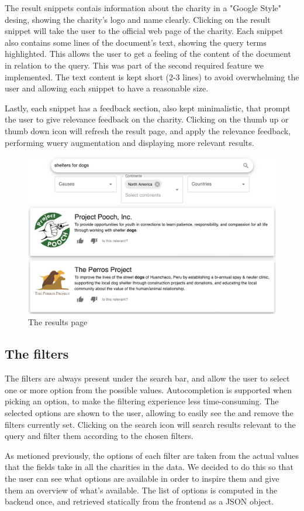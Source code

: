 \documentclass[unicode,9pt,a4paper,oneside,numbers=endperiod,openany]{scrartcl}
\begin{document}
The result snippets contais information about the charity in a "Google Style" desing, showing the charity's logo and name clearly.
Clicking on the result snippet will take the user to the official web page of the charity. 
Each snippet also contains some lines of the document's text, showing the query terms highlighted. This allows the user to 
get a feeling of the content of the document in relation to the query. This was part of the second required feature we implemented.
The text content is kept short (2-3 lines) to avoid overwhelming the user and allowing each snippet to have a reasonable size.

Lastly, each snippet has a feedback section, also kept minimalistic, that prompt the user to give relevance feedback on the charity.
Clicking on the thumb up or thumb down icon will refresh the result page, and apply the relevance feedback, performing wuery augmentation and displaying more relevant results.

\begin{figure}[h]
    \centering
    \includegraphics[width=0.6\linewidth]{fig/results-page.png}
    \caption{The results page}
\end{figure}


\subsection{The filters}

The filters are always present under the search bar, and allow the user to select one or more option from the possible values.
Autocompletion is supported when picking an option, to make the filtering experience less time-consuming.
The selected options are shown to the user, allowing to easily see the and remove the filters currently set.
Clicking on the search icon will search results relevant to the query and filter them according to the chosen filters.

As metioned previously, the options of each filter are taken from the actual values that the fields take in all the charities in the data.
We decided to do this so that the user can see what options are available in order to inspire them and give them an overview of what's available.
The list of options is computed in the backend once, and retrieved statically from the frontend as a JSON object.
\end{document}
